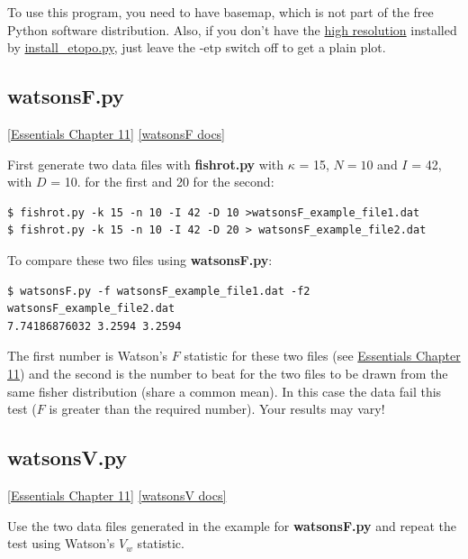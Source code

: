 \documentclass[11pt]{book}
\begin{document}
{To use this program, you need to have basemap, which is not part of the free Python software distribution.  Also, if you don't have the  \href{#hires}{high resolution} installed by \href{#install_etopo.py}{install_etopo.py}, just leave the -etp switch off to get a plain plot.



\subsection{watsonsF.py}
\href{http://earthref.org/MAGIC/books/Tauxe/Essentials/WebBook3ch11.html#ch11}{[Essentials Chapter 11]}
\href{https://github.com/PmagPy/PmagPy/blob/master/programs/watsonsF.py}{[watsonsF docs]}

First generate two data files with {\bf fishrot.py} with $\kappa$ = 15, $N=10$ and $I$ = 42, with $D$ = 10. for the first and 20 for the second:

\begin{verbatim}
$ fishrot.py -k 15 -n 10 -I 42 -D 10 >watsonsF_example_file1.dat
$ fishrot.py -k 15 -n 10 -I 42 -D 20 > watsonsF_example_file2.dat
\end{verbatim}

To compare these two files using {\bf watsonsF.py}:

\begin{verbatim}
$ watsonsF.py -f watsonsF_example_file1.dat -f2 watsonsF_example_file2.dat
7.74186876032 3.2594 3.2594
\end{verbatim}

The first number is Watson's  $F$ statistic for these two files (see \href{http://earthref.org/MAGIC/books/Tauxe/Essentials/WebBook3ch11.html#ch11}{Essentials Chapter 11}) and the second is the number to beat for the two files to be drawn from the same fisher distribution (share a common mean).   In this case  the data fail this test ($F$ is greater than the required number).    Your results may vary!

\subsection{watsonsV.py}
\href{http://earthref.org/MAGIC/books/Tauxe/Essentials/WebBook3ch11.html#ch11}{[Essentials Chapter 11]}
\href{https://github.com/PmagPy/PmagPy/blob/master/programs/watsonsV.py}{[watsonsV docs]}


Use the two data files generated in the example for {\bf watsonsF.py} and repeat the test using Watson's $V_w$ statistic.

}
\end{document}
